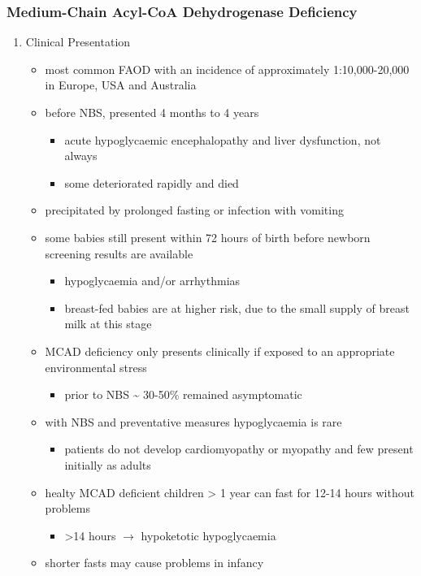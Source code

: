 \documentclass[12pt]{scrartcl}
\begin{document}
\subsubsection{Medium-Chain Acyl-CoA Dehydrogenase Deficiency}
\label{sec:org919e570}
\begin{enumerate}
\item Clinical Presentation
\label{sec:org79511d1}
\begin{itemize}
\item most common FAOD with an incidence of approximately 1:10,000-20,000
in Europe, USA and Australia
\item before NBS, presented 4 months to 4 years
\begin{itemize}
\item acute hypoglycaemic encephalopathy and liver dysfunction, not always
\item some deteriorated rapidly and died
\end{itemize}
\item precipitated by prolonged fasting or infection with vomiting
\item some babies still present within 72 hours of birth before
newborn screening results are available
\begin{itemize}
\item hypoglycaemia and/or arrhythmias
\item breast-fed babies are at higher risk, due to the small supply of
breast milk at this stage
\end{itemize}
\item MCAD deficiency only presents clinically if exposed to an
appropriate environmental stress
\begin{itemize}
\item prior to NBS \textasciitilde{} 30-50\% remained asymptomatic
\end{itemize}
\item with NBS and preventative measures hypoglycaemia is rare
\begin{itemize}
\item patients do not develop cardiomyopathy or myopathy and few present
initially as adults
\end{itemize}
\item healty MCAD deficient children > 1 year can fast for 12-14 hours without problems
\begin{itemize}
\item >14 hours \(\to\) hypoketotic hypoglycaemia
\end{itemize}
\item shorter fasts may cause problems in infancy

\end{itemize}
\end{enumerate}
\end{document}
